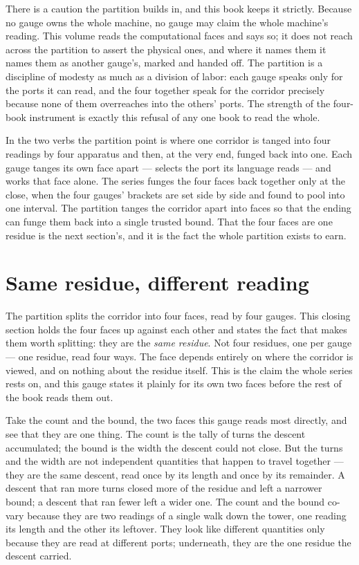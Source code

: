 There is a caution the partition builds in, and this book keeps it strictly. Because no gauge owns the whole machine,
no gauge may claim the whole machine's reading. This volume reads the computational faces and says so; it does not reach
across the partition to assert the physical ones, and where it names them it names them as another gauge's, marked and
handed off. The partition is a discipline of modesty as much as a division of labor: each gauge speaks only for the
ports it can read, and the four together speak for the corridor precisely because none of them overreaches into the
others' ports. The strength of the four-book instrument is exactly this refusal of any one book to read the whole.

In the two verbs the partition point is where one corridor is tanged into four readings by four apparatus and then, at
the very end, funged back into one. Each gauge tanges its own face apart --- selects the port its language reads --- and
works that face alone. The series funges the four faces back together only at the close, when the four gauges' brackets
are set side by side and found to pool into one interval. The partition tanges the corridor apart into faces so that the
ending can funge them back into a single trusted bound. That the four faces are one residue is the next section's, and
it is the fact the whole partition exists to earn.

\section{Same residue, different reading}

The partition splits the corridor into four faces, read by four gauges. This closing section holds the four faces up
against each other and states the fact that makes them worth splitting: they are the \emph{same residue}. Not four
residues, one per gauge --- one residue, read four ways. The face depends entirely on where the corridor is viewed, and
on nothing about the residue itself. This is the claim the whole series rests on, and this gauge states it plainly for
its own two faces before the rest of the book reads them out.

Take the count and the bound, the two faces this gauge reads most directly, and see that they are one thing. The count
is the tally of turns the descent accumulated; the bound is the width the descent could not close. But the turns and the
width are not independent quantities that happen to travel together --- they are the same descent, read once by its
length and once by its remainder. A descent that ran more turns closed more of the residue and left a narrower bound; a
descent that ran fewer left a wider one. The count and the bound co-vary because they are two readings of a single walk
down the tower, one reading its length and the other its leftover. They look like different quantities only because they
are read at different ports; underneath, they are the one residue the descent carried.

